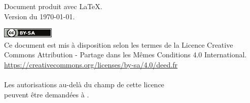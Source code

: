 
\thispagestyle{empty}

\vfill

\bigskip
\noindent
Document produit avec \LaTeX.
\\Version du \today.

\vfill

\noindent
\includegraphics[width=25mm]{images/cc-by-sa}
\\Ce document est mis à disposition selon les termes de la Licence Creative
\\Commons Attribution - Partage dans les Mêmes Conditions 4.0 International.
\\\url{https://creativecommons.org/licenses/by-sa/4.0/deed.fr}
\\
\\Les autorisations au-delà du champ de cette licence
\\peuvent être demandées à \texttt{\contact}.

